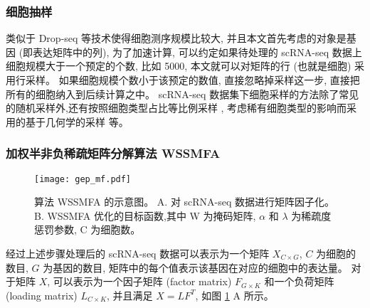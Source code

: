 \subsubsection{细胞抽样}
类似于 Drop-seq 等技术使得细胞测序规模比较大, 并且本文首先考虑的对象是基因 (即表达矩阵中的列), 
为了加速计算, 可以约定如果待处理的 scRNA-seq 数据上细胞规模大于一个预定的个数, 比如 5000,
本文就可以对矩阵的行 (也就是细胞) 采用行采样。
如果细胞规模个数小于该预定的数值, 直接忽略掉采样这一步, 
直接把所有的细胞纳入到后续计算之中。
 scRNA-seq 数据集下细胞采样的方法除了常见的随机采样外,还有按照细胞类型占比等比例采样 ,
考虑稀有细胞类型的影响而采用的基于几何学的采样  等。

\subsubsection{加权半非负稀疏矩阵分解算法 WSSMFA}

\begin{figure}[!htbp]
    \centering
    \texttt{[image: gep\_mf.pdf]}
    \caption{
        算法 WSSMFA 的示意图。
        A. 对 scRNA-seq 数据进行矩阵因子化。
        B. WSSMFA 优化的目标函数,其中 W 为掩码矩阵, $\alpha$ 和 $\lambda$ 为稀疏度惩罚参数, C 为细胞数。
    }
    \label{fig:gep-mf}
\end{figure}

经过上述步骤处理后的 scRNA-seq 数据可以表示为一个矩阵 $X_{C \times G}$, $C$ 为细胞的数目, $G$ 为基因的数目, 
矩阵中的每个值表示该基因在对应的细胞中的表达量。
对于矩阵 $X$, 可以表示为一个因子矩阵 (factor matrix) $F_{G \times K}$ 和一个负荷矩阵 (loading matrix) $L_{C \times K}$,
并且满足 $X=LF^T$, 如图 \ref{fig:gep-mf} A 所示。 

